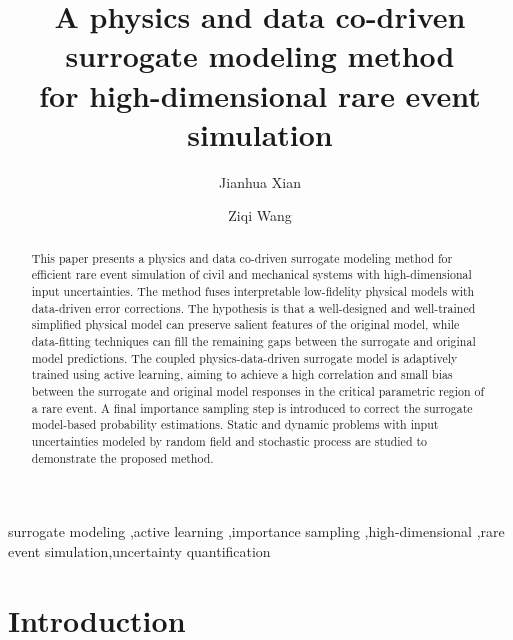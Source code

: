 \documentclass[number,preprint,3p]{elsarticle}
\newcommand{\1}[2]{\mathbb{I}_{#1}\left(#2\right)}
\begin{document}
	\begin{frontmatter}
		\renewcommand{\thefootnote}{\fnsymbol{footnote}}
		\title{A physics and data co-driven surrogate modeling method \\ for high-dimensional rare event simulation}
		\author[1]{Jianhua Xian}
		\author[1]{Ziqi Wang}
		\address[1]{Department of Civil and Environmental Engineering, University of California, Berkeley, United States}
		\begin{abstract}
			This paper presents a physics and data co-driven surrogate modeling method for efficient rare event simulation of civil and mechanical systems with high-dimensional input uncertainties. The method fuses interpretable low-fidelity physical models with data-driven error corrections. The hypothesis is that a well-designed and well-trained simplified physical model can preserve salient features of the original model, while data-fitting techniques can fill the remaining gaps between the surrogate and original model predictions. The coupled physics-data-driven surrogate model is adaptively trained using active learning, aiming to achieve a high correlation and small bias between the surrogate and original model responses in the critical parametric region of a rare event. A final importance sampling step is introduced to correct the surrogate model-based probability estimations. Static and dynamic problems with input uncertainties modeled by random field and stochastic process are studied to demonstrate the proposed method.		
		\end{abstract}
		
		\begin{keyword}
		surrogate modeling \sep active learning \sep importance sampling \sep high-dimensional \sep rare event simulation\sep uncertainty quantification
		\end{keyword}
		
	\end{frontmatter}
	
	\renewcommand{\thefootnote}{\fnsymbol{footnote}}
	
	\section{Introduction}
	
\end{document}
